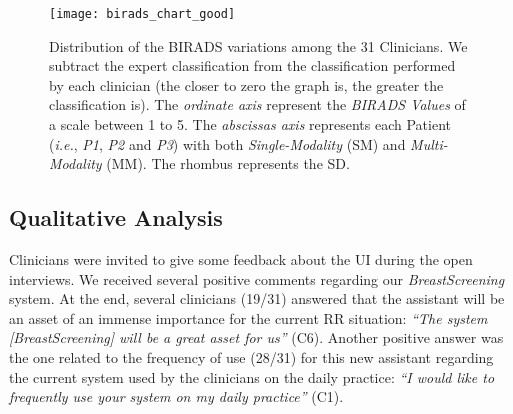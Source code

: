 
\begin{figure}[ht]
\centering
\texttt{[image: birads\_chart\_good]}
\caption{\scriptsize Distribution of the BIRADS variations among the 31 Clinicians.
We subtract the expert classification from the classification performed by each clinician
(the closer to zero the graph is, the greater the classification is). The \textit{ordinate axis} represent the \textit{BIRADS Values} of a scale between 1 to 5.
The \textit{abscissas axis} represents each Patient ({\em i.e.}, \textit{P1}, \textit{P2} and \textit{P3}) with both \textit{Single-Modality} (SM) and \textit{Multi-Modality} (MM).
The rhombus represents the SD.}
\label{fig:birads_chart}
\end{figure}

\subsection{Qualitative Analysis}

Clinicians were invited to give some feedback about the UI during the open interviews.
We received several positive comments regarding our \textit{BreastScreening} system.
At the end, several clinicians (19/31) answered that the assistant will be an asset of an immense importance for the current RR situation:
\textit{``The system [\textit{BreastScreening}] will be a great asset for us''} (C6).
Another positive answer was the one related to the frequency of use (28/31) for this new assistant regarding the current system used by the clinicians on the daily practice:
\textit{``I would like to frequently use your system on my daily practice''} (C1).